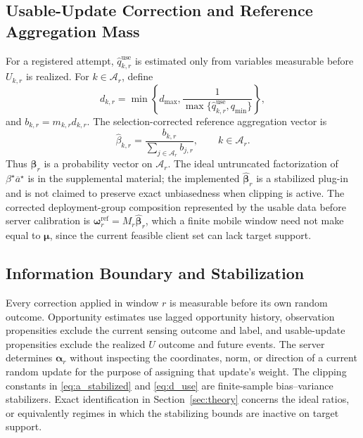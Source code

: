 \documentclass[letterpaper,journal]{IEEEtran}
\begin{document}
\subsection{Usable-Update Correction and Reference Aggregation Mass}
\label{subsec:usable_correction}

For a registered attempt, $\widehat q^{\mathrm{use}}_{k,r}$ is estimated only
from variables measurable before $U_{k,r}$ is realized.  For
$k\in\mathcal{A}_r$, define
\begin{equation}
 d_{k,r}
 =
 \min\!\left\{
 d_{\max},
 \frac{1}
 {\max\{\widehat q^{\mathrm{use}}_{k,r},q_{\min}\}}
 \right\},
 \label{eq:d_use}
\end{equation}
and $b_{k,r}=m_{k,r}d_{k,r}$.
The selection-corrected reference aggregation vector is
\begin{equation}
 \widehat\beta_{k,r}
 =
 \frac{b_{k,r}}
 {\sum_{j\in\mathcal{A}_r}b_{j,r}},
 \qquad
 k\in\mathcal{A}_r.
 \label{eq:beta_ref}
\end{equation}
Thus $\widehat{\boldsymbol\beta}_r$ is a probability vector on
$\mathcal{A}_r$.  The ideal untruncated factorization of
$\beta^\star\overline a^\star$ is in the supplemental material; the implemented
$\widehat{\boldsymbol\beta}_r$ is a stabilized plug-in and is not claimed to
preserve exact unbiasedness when clipping is active.  The corrected
deployment-group composition represented by the usable data before server
calibration is $\boldsymbol\omega_r^{\mathrm{ref}}=M_r\widehat{\boldsymbol\beta}_r$,
which a finite mobile window need not make equal to $\boldsymbol\mu$, since the
current feasible client set can lack target support.

\subsection{Information Boundary and Stabilization}
\label{subsec:information_boundary}

Every correction applied in window $r$ is measurable before its own random
outcome.  Opportunity estimates use lagged opportunity history,
observation propensities exclude the current sensing outcome and label,
and usable-update propensities exclude the realized $U$ outcome and
future events.  The server determines $\boldsymbol\alpha_r$ without
inspecting the coordinates, norm, or direction of a current random
update for the purpose of assigning that update's weight.  The clipping
constants in \eqref{eq:a_stabilized} and \eqref{eq:d_use} are
finite-sample bias--variance stabilizers.  Exact identification in
Section~\ref{sec:theory} concerns the ideal ratios, or equivalently
regimes in which the stabilizing bounds are inactive on target support.
\end{document}
